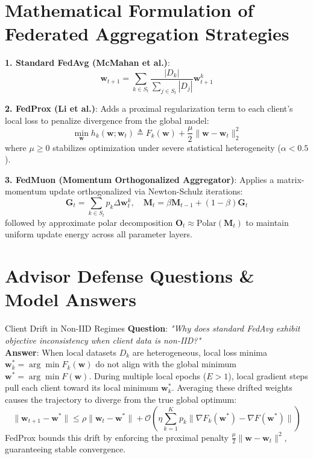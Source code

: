 \documentclass[11pt,a4paper,titlepage]{report}
\begin{document}
\section{Mathematical Formulation of Federated Aggregation Strategies}
\begin{mathfoundation}
\textbf{1. Standard FedAvg (McMahan et al.)}:
\begin{equation}
    \mathbf{w}_{t+1} = \sum_{k \in S_t} \frac{|D_k|}{\sum_{j \in S_t} |D_j|} \mathbf{w}_{t+1}^k
\end{equation}

\textbf{2. FedProx (Li et al.)}:
Adds a proximal regularization term to each client's local loss to penalize divergence from the global model:
\begin{equation}
    \min_{\mathbf{w}} h_k(\mathbf{w}; \mathbf{w}_t) \triangleq F_k(\mathbf{w}) + \frac{\mu}{2} \|\mathbf{w} - \mathbf{w}_t\|_2^2
\end{equation}
where $\mu \ge 0$ stabilizes optimization under severe statistical heterogeneity ($\alpha < 0.5$).

\textbf{3. FedMuon (Momentum Orthogonalized Aggregator)}:
Applies a matrix-momentum update orthogonalized via Newton-Schulz iterations:
\begin{equation}
    \mathbf{G}_{t} = \sum_{k \in S_t} p_k \Delta\mathbf{w}_t^k, \quad \mathbf{M}_t = \beta \mathbf{M}_{t-1} + (1 - \beta) \mathbf{G}_t
\end{equation}
followed by approximate polar decomposition $\mathbf{O}_t \approx \text{Polar}(\mathbf{M}_t)$ to maintain uniform update energy across all parameter layers.
\end{mathfoundation}

\section{Advisor Defense Questions \& Model Answers}
\begin{defenseqa}{Client Drift in Non-IID Regimes}
\textbf{Question}: \textit{"Why does standard FedAvg exhibit objective inconsistency when client data is non-IID?"}\\
\textbf{Answer}: When local datasets $D_k$ are heterogeneous, local loss minima $\mathbf{w}_k^* = \arg\min F_k(\mathbf{w})$ do not align with the global minimum $\mathbf{w}^* = \arg\min F(\mathbf{w})$. During multiple local epochs ($E > 1$), local gradient steps pull each client toward its local minimum $\mathbf{w}_k^*$. Averaging these drifted weights causes the trajectory to diverge from the true global optimum:
\begin{equation}
    \|\mathbf{w}_{t+1} - \mathbf{w}^*\| \le \rho \|\mathbf{w}_t - \mathbf{w}^*\| + \mathcal{O}\left( \eta \sum_{k=1}^K p_k \|\nabla F_k(\mathbf{w}^*) - \nabla F(\mathbf{w}^*)\| \right)
\end{equation}
FedProx bounds this drift by enforcing the proximal penalty $\frac{\mu}{2}\|\mathbf{w} - \mathbf{w}_t\|^2$, guaranteeing stable convergence.
\end{defenseqa}
\end{document}
